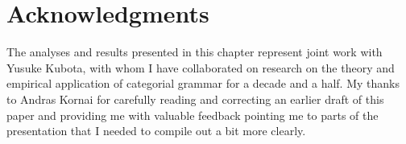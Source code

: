 \documentclass[output=paper,colorlinks,citecolor=brown]{langscibook}
\begin{document}
\section*{Acknowledgments}
The analyses and results
presented in this chapter represent joint work with Yusuke Kubota, with whom I
have collaborated on research on the theory and empirical application of
categorial grammar for a decade and a half. My thanks to Andras Kornai
for carefully reading and correcting an earlier draft of this paper
and providing me with valuable feedback pointing me to parts of
the presentation that I needed to compile out a bit more clearly.

{\sloppy\printbibliography[heading=subbibliography,notkeyword=this]}
\end{document}
